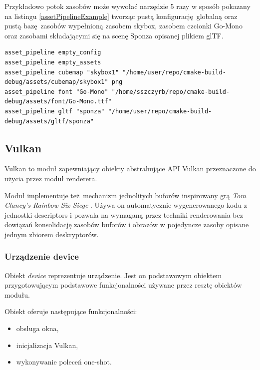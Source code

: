 Przykładowo potok zasobów może wywołać narzędzie 5 razy w sposób pokazany na listingu \ref{assetPipelineExample} tworząc pustą konfigurację globalną oraz pustą bazę zasobów wypełnioną zasobem skybox, zasobem czcionki Go-Mono oraz zasobami składającymi się na scenę Sponza opisanej plikiem glTF.
\lstset{language=verbatim}
\begin{lstlisting}[caption={Komendy wywoływane przez przykładowy potok zasobów},captionpos=b,label={assetPipelineExample}]
asset_pipeline empty_config
asset_pipeline empty_assets
asset_pipeline cubemap "skybox1" "/home/user/repo/cmake-build-debug/assets/cubemap/skybox1" png
asset_pipeline font "Go-Mono" "/home/sszczyrb/repo/cmake-build-debug/assets/font/Go-Mono.ttf"
asset_pipeline gltf "sponza" "/home/user/repo/cmake-build-debug/assets/gltf/sponza"
\end{lstlisting}

\subsection{Vulkan}

Vulkan to moduł zapewniający obiekty abstrahujące API Vulkan przeznaczone do użycia przez moduł renderera.

Moduł implementuje też mechanizm jednolitych buforów inspirowany grą \textit{Tom Clancy's Rainbow Six Siege} \cite{RAINBOWSIXSIEGE}.
Używa on automatycznie wygenerowanego kodu z jednostki descriptors i pozwala na wymaganą przez techniki renderowania bez dowiązań konsolidację zasobów buforów i obrazów w pojedyncze zasoby opisane jednym zbiorem deskryptorów.

\subsubsection{Urządzenie device}
Obiekt \textit{device} reprezentuje urządzenie.
Jest on podstawowym obiektem przygotowującym podstawowe funkcjonalności używane przez resztę obiektów modułu.


Obiekt oferuje następujące funkcjonalności:
\begin{itemize}
	\item obsługa okna,
	\item inicjalizacja Vulkan,
	\item wykonywanie poleceń one-shot.
\end{itemize}

